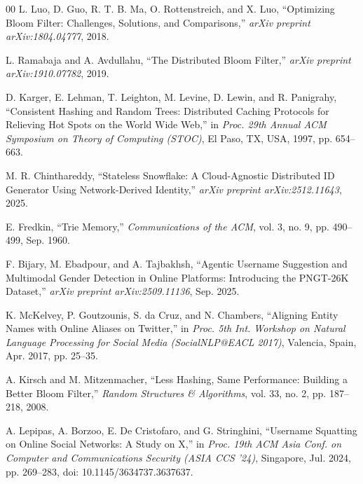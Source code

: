 \documentclass[conference]{IEEEtran}
\begin{document}
\begin{thebibliography}{00}
 L. Luo, D. Guo, R. T. B. Ma, O. Rottenstreich, and X. Luo, ``Optimizing Bloom Filter: Challenges, Solutions, and Comparisons,'' \emph{arXiv preprint arXiv:1804.04777}, 2018.

 L. Ramabaja and A. Avdullahu, ``The Distributed Bloom Filter,'' \emph{arXiv preprint arXiv:1910.07782}, 2019.

 D. Karger, E. Lehman, T. Leighton, M. Levine, D. Lewin, and R. Panigrahy, ``Consistent Hashing and Random Trees: Distributed Caching Protocols for Relieving Hot Spots on the World Wide Web,'' in \emph{Proc. 29th Annual ACM Symposium on Theory of Computing (STOC)}, El Paso, TX, USA, 1997, pp. 654--663.

 M. R. Chinthareddy, ``Stateless Snowflake: A Cloud-Agnostic Distributed ID Generator Using Network-Derived Identity,'' \textit{arXiv preprint arXiv:2512.11643}, 2025.

 E. Fredkin, ``Trie Memory,'' \textit{Communications of the ACM}, vol. 3, no. 9, pp. 490--499, Sep. 1960.

 F. Bijary, M. Ebadpour, and A. Tajbakhsh, ``Agentic Username Suggestion and Multimodal Gender Detection in Online Platforms: Introducing the PNGT-26K Dataset,'' \textit{arXiv preprint arXiv:2509.11136}, Sep. 2025.

 K. McKelvey, P. Goutzounis, S. da Cruz, and N. Chambers,
``Aligning Entity Names with Online Aliases on Twitter,'' in
\textit{Proc. 5th Int. Workshop on Natural Language Processing for
Social Media (SocialNLP@EACL 2017)}, Valencia, Spain, Apr. 2017,
pp. 25--35.

 A. Kirsch and M. Mitzenmacher, ``Less Hashing, Same
Performance: Building a Better Bloom Filter,'' \textit{Random
Structures \& Algorithms}, vol. 33, no. 2, pp. 187--218, 2008.

 A. Lepipas, A. Borzoo, E. De Cristofaro, and G. Stringhini,
``Username Squatting on Online Social Networks: A Study on X,'' in
\textit{Proc. 19th ACM Asia Conf. on Computer and Communications
Security (ASIA CCS '24)}, Singapore, Jul. 2024, pp. 269--283,
doi: 10.1145/3634737.3637637.

\end{thebibliography}
\end{document}
